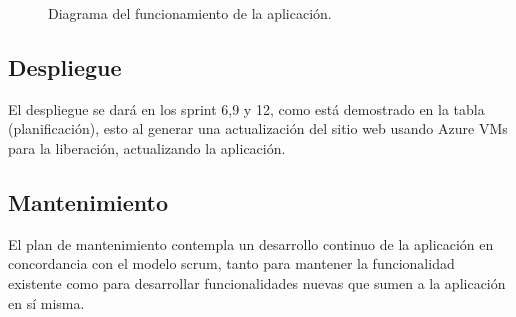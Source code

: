 \begin{figure}
    \centering
    \caption[Diagrama del funcionamiento de la aplicación.]{Diagrama del funcionamiento de la aplicación.}
    \label{fig:funcionamiento}
    
\end{figure}


\subsection{Despliegue}

El despliegue se dará en los sprint 6,9 y 12, como está demostrado en la tabla (planificación), esto al generar una actualización del sitio web usando Azure VMs para la liberación, actualizando la aplicación. 

\subsection{Mantenimiento}

El plan de mantenimiento contempla un desarrollo continuo de la aplicación en concordancia con el modelo scrum, tanto para mantener la funcionalidad existente como para desarrollar funcionalidades nuevas que sumen a la aplicación en sí misma.